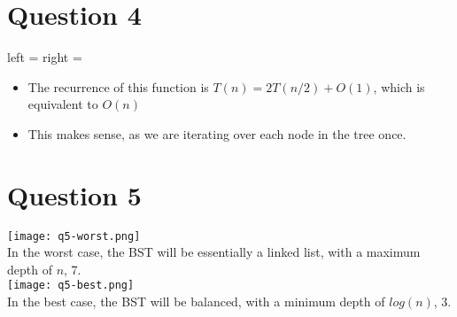 \documentclass{article}
\begin{document}
	\pagebreak
	\section{Question 4}
		\begin{algorithmic}
					\State {}
				\EndIf
				
				\State left = 
				\State right = 
				\State \Return {}
				
			\EndFunction
		\end{algorithmic}
	
		\begin{itemize}
			\item The recurrence of this function is $T(n) = 2T(n/2) + O(1)$, which is equivalent to $O(n)$
			\item This makes sense, as we are iterating over each node in the tree once.
		\end{itemize}
	
	\section{Question 5}
	\begin{center}
		\texttt{[image: q5-worst.png]} \\
		In the worst case, the BST will be essentially a linked list, with a maximum depth of $n$, 7. \\ 
		\texttt{[image: q5-best.png]} \\
		In the best case, the BST will be balanced, with a minimum depth of $log(n)$, 3.
	\end{center}

\pagebreak
\end{document}

